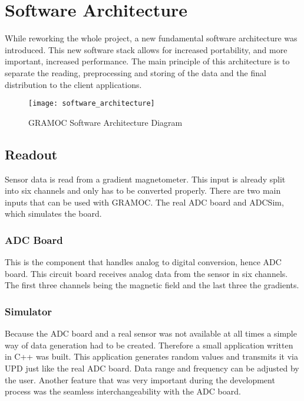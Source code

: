 \chapter{Software Architecture}
\label{ch:Software_Architecture}

\author{Nico Kratky}
%
While reworking the whole project, a new fundamental software architecture was introduced. This new software stack allows for increased portability, and more important, increased performance. The main principle of this architecture is to separate the reading, preprocessing and storing of the data and the final distribution to the client applications.

\begin{figure}[H]
    \centering
    \texttt{[image: software\_architecture]}
    \caption{GRAMOC Software Architecture Diagram}
    \label{fig:software_architecture}
\end{figure}

\section{Readout}

Sensor data is read from a gradient magnetometer. This input is already split into six channels and only has to be converted properly. There are two main inputs that can be used with GRAMOC. The real ADC board and ADCSim, which simulates the board.

\subsection{ADC Board}

This is the component that handles analog to digital conversion, hence ADC board. This circuit board receives analog data from the sensor in six channels. The first three channels being the magnetic field and the last three the gradients.

\subsection{Simulator}

Because the ADC board and a real sensor was not available at all times a simple way of data generation had to be created. Therefore a small application written in C++ was built. This application generates random values and transmits it via UPD just like the real ADC board. Data range and frequency can be adjusted by the user. Another feature that was very important during the development process was the seamless interchangeability with the ADC board.
